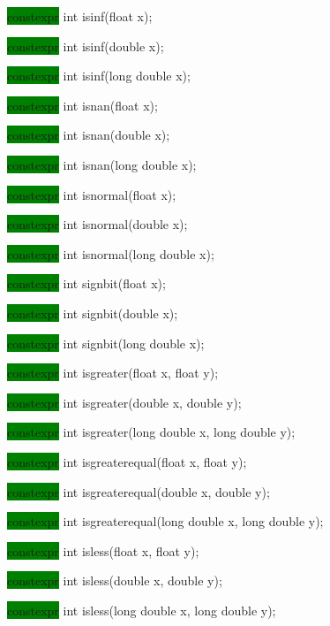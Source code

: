 \documentclass[prd,twocolumn,amsmath,amssymb,nofootinbib,eqsecnum]{revtex4-1}
\newcommand{\highlight}[1]{\colorbox{green}{\!\!\!\! #1}}
\begin{document}
{\highlight{constexpr} int isinf(float x);

\highlight{constexpr} int isinf(double x);

\highlight{constexpr} int isinf(long double x);

\vspace{2ex}

\highlight{constexpr} int isnan(float x);

\highlight{constexpr} int isnan(double x);

\highlight{constexpr} int isnan(long double x);

\vspace{2ex}

\highlight{constexpr} int isnormal(float x);

\highlight{constexpr} int isnormal(double x);

\highlight{constexpr} int isnormal(long double x);

\vspace{2ex}

\highlight{constexpr} int signbit(float x);

\highlight{constexpr} int signbit(double x);

\highlight{constexpr} int signbit(long double x);

\vspace{2ex}

\highlight{constexpr} int isgreater(float x, float y);

\highlight{constexpr} int isgreater(double x, double y);

\highlight{constexpr} int isgreater(long double x, long double y);

\vspace{2ex}

\highlight{constexpr} int isgreaterequal(float x, float y);

\highlight{constexpr} int isgreaterequal(double x, double y);

\highlight{constexpr} int isgreaterequal(long double x, long double y);

\vspace{2ex}

\highlight{constexpr} int isless(float x, float y);

\highlight{constexpr} int isless(double x, double y);

\highlight{constexpr} int isless(long double x, long double y);

\vspace{2ex}

}
\end{document}
